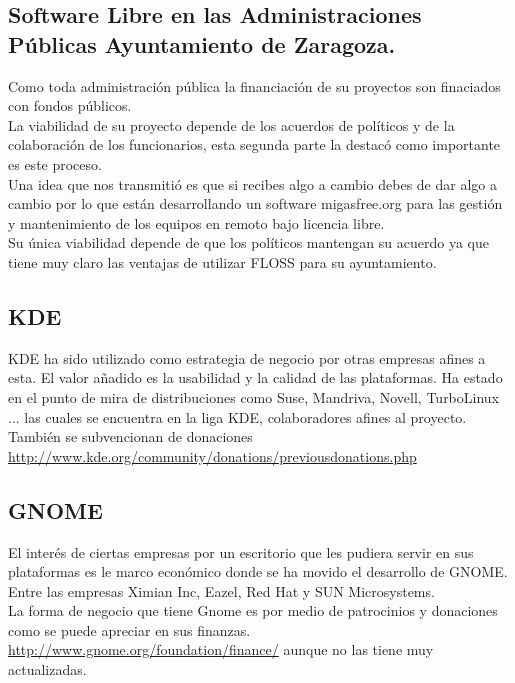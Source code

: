 \documentclass[12pt]{article} %
\begin{document}
\subsection{Software Libre en las Administraciones Públicas Ayuntamiento de Zaragoza.} %

Como toda administración pública la financiación de su proyectos son finaciados con fondos públicos.\\La viabilidad de su proyecto depende de los acuerdos de políticos y de la colaboración de los funcionarios, esta segunda parte la destacó como importante es este proceso.\\Una idea que nos transmitió es que si recibes algo a cambio debes de dar algo a cambio por lo que están desarrollando un software migasfree.org para las gestión y mantenimiento de los equipos en remoto bajo licencia libre.\\Su única viabilidad depende de que los políticos mantengan su acuerdo ya que tiene muy claro las ventajas de utilizar FLOSS para su ayuntamiento. 

\subsection{KDE} %

KDE ha sido utilizado como estrategia de negocio por otras empresas afines a esta. El valor añadido es la usabilidad y la calidad de las plataformas. Ha estado en el punto de mira de distribuciones como Suse, Mandriva, Novell, TurboLinux ... las cuales se encuentra en la liga KDE, colaboradores afines al proyecto. \\También se subvencionan de donaciones \url{http://www.kde.org/community/donations/previousdonations.php}

\subsection{GNOME} %

El interés de ciertas empresas por un escritorio que les pudiera servir en sus plataformas es le marco económico donde se ha movido el desarrollo de GNOME. Entre las empresas Ximian Inc, Eazel, Red Hat y SUN Microsystems.\\ La forma de negocio que tiene Gnome es por medio de patrocinios y donaciones como se puede apreciar en sus finanzas. \url{http://www.gnome.org/foundation/finance/} aunque no las tiene muy actualizadas.
\end{document}
